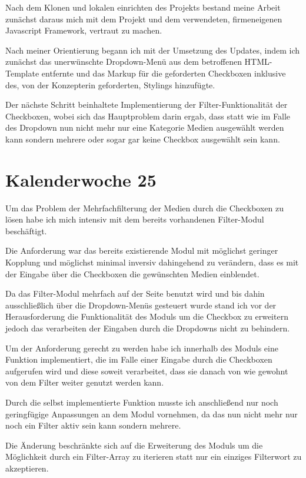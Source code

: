 \documentclass[11pt]{article} %
\begin{document}
Nach dem Klonen und lokalen einrichten des Projekts bestand meine Arbeit zunächst daraus mich mit dem Projekt und dem verwendeten, firmeneigenen Javascript Framework, vertraut zu machen.

Nach meiner Orientierung begann ich mit der Umsetzung des Updates, indem ich zunächst das unerwünschte Dropdown-Menü aus dem betroffenen HTML-Template entfernte und das Markup für die geforderten Checkboxen inklusive des, von der Konzepterin geforderten, Stylings hinzufügte.

Der nächste Schritt beinhaltete Implementierung der Filter-Funktionalität der Checkboxen, wobei sich das Hauptproblem darin ergab, dass statt wie im Falle des Dropdown nun nicht mehr nur eine Kategorie Medien ausgewählt werden kann sondern mehrere oder sogar gar keine Checkbox ausgewählt sein kann.

\section{Kalenderwoche 25} \label{sec:kw2}

Um das Problem der Mehrfachfilterung der Medien durch die Checkboxen zu lösen habe ich mich intensiv mit dem bereits vorhandenen Filter-Modul beschäftigt.

Die Anforderung war das bereits existierende Modul mit möglichst geringer Kopplung und möglichst minimal inversiv dahingehend zu verändern, dass es mit der Eingabe über die Checkboxen die gewünschten Medien einblendet. 

Da das Filter-Modul mehrfach auf der Seite benutzt wird und bis dahin ausschließlich über die Dropdown-Menüs gesteuert wurde stand ich vor der Herausforderung die Funktionalität des Moduls um die Checkbox zu erweitern jedoch das verarbeiten der Eingaben durch die Dropdowns nicht zu behindern.

Um der Anforderung gerecht zu werden habe ich innerhalb des Moduls eine Funktion implementiert, die im Falle einer Eingabe durch die Checkboxen aufgerufen wird und diese soweit verarbeitet, dass sie danach von wie gewohnt von dem Filter weiter genutzt werden kann.

Durch die selbst implementierte Funktion musste ich anschließend nur noch geringfügige Anpassungen an dem Modul vornehmen, da das nun nicht mehr nur noch ein Filter aktiv sein kann sondern mehrere.

Die Änderung beschränkte sich auf die Erweiterung des Moduls um die Möglichkeit durch ein Filter-Array zu iterieren statt nur ein einziges Filterwort zu akzeptieren. 
\end{document}
